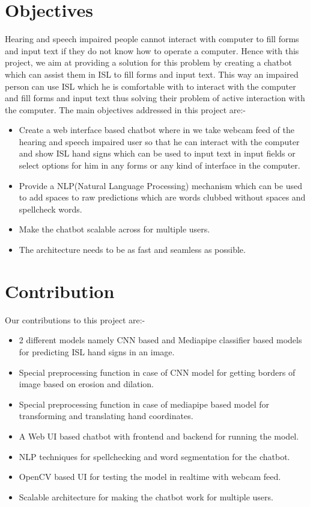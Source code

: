 \documentclass[12pt,a4paper]{report}
\begin{document}
\section{Objectives}
Hearing and speech impaired people cannot interact with computer to fill forms and input text if they do not know how to operate a computer. Hence with this project, we aim at providing a solution for this problem by creating a chatbot which can assist them in ISL to fill forms and input text. This way an impaired person can use ISL which he is comfortable with to interact with the computer and fill forms and input text thus solving their problem of active interaction with the computer. 
The main objectives addressed in this project are:-
\begin{itemize}
	\item Create a web interface based chatbot where in we take webcam feed of the hearing and speech impaired user so that he can interact with the computer and show ISL hand signs which can be used to input text in input fields or select options for him in any forms or any kind of interface in the computer.
	\item Provide a NLP(Natural Language Processing) mechanism which can be used to add spaces to raw predictions which are words clubbed without spaces and spellcheck words.
	\item Make the chatbot scalable across for multiple users.
	\item The architecture needs to be as fast and seamless as possible.
\end{itemize}

\section{Contribution}
Our contributions to this project are:-
\begin{itemize}
	\item 2 different models namely CNN based and Mediapipe classifier based models for predicting ISL hand signs in an image.
	\item Special preprocessing function in case of CNN model for getting borders of image based on erosion and dilation.
	\item Special preprocessing function in case of mediapipe based model for transforming and translating hand coordinates.
	\item A Web UI based chatbot with frontend and backend for running the model.
	\item NLP techniques for spellchecking and word segmentation for the chatbot.
	\item OpenCV based UI for testing the model in realtime with webcam feed.
	\item Scalable architecture for making the chatbot work for multiple users.
\end{itemize}
\end{document}
